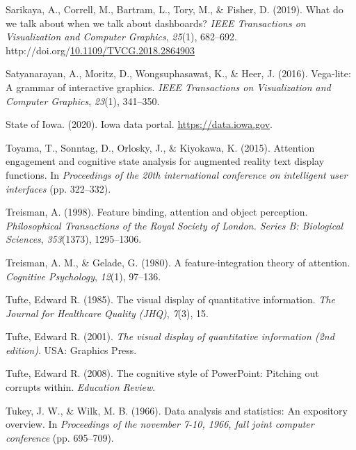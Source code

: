\documentclass[print]{nuthesis}
\newlength{\cslhangindent}
\newenvironment{CSLReferences}[2]%
{\setlength{\parindent}{0pt}%
\everypar{\setlength{\hangindent}{\cslhangindent}}\ignorespaces}%
{\par}
\begin{document}
\begin{CSLReferences}{1}{0}
\leavevmode{}%
Sarikaya, A., Correll, M., Bartram, L., Tory, M., \& Fisher, D. (2019). What do we talk about when we talk about dashboards? \emph{IEEE Transactions on Visualization and Computer Graphics}, \emph{25}(1), 682--692. http://doi.org/\href{https://doi.org/10.1109/TVCG.2018.2864903}{10.1109/TVCG.2018.2864903}

\leavevmode{}%
Satyanarayan, A., Moritz, D., Wongsuphasawat, K., \& Heer, J. (2016). Vega-lite: A grammar of interactive graphics. \emph{IEEE Transactions on Visualization and Computer Graphics}, \emph{23}(1), 341--350.

\leavevmode{}%
State of Iowa. (2020). Iowa data portal. \url{https://data.iowa.gov}.

\leavevmode{}%
Toyama, T., Sonntag, D., Orlosky, J., \& Kiyokawa, K. (2015). Attention engagement and cognitive state analysis for augmented reality text display functions. In \emph{Proceedings of the 20th international conference on intelligent user interfaces} (pp. 322--332).

\leavevmode{}%
Treisman, A. (1998). Feature binding, attention and object perception. \emph{Philosophical Transactions of the Royal Society of London. Series B: Biological Sciences}, \emph{353}(1373), 1295--1306.

\leavevmode{}%
Treisman, A. M., \& Gelade, G. (1980). A feature-integration theory of attention. \emph{Cognitive Psychology}, \emph{12}(1), 97--136.

\leavevmode{}%
Tufte, Edward R. (1985). The visual display of quantitative information. \emph{The Journal for Healthcare Quality (JHQ)}, \emph{7}(3), 15.

\leavevmode{}%
Tufte, Edward R. (2001). \emph{The visual display of quantitative information (2nd edition)}. USA: Graphics Press.

\leavevmode{}%
Tufte, Edward R. (2008). The cognitive style of PowerPoint: Pitching out corrupts within. \emph{Education Review}.

\leavevmode{}%
Tukey, J. W., \& Wilk, M. B. (1966). Data analysis and statistics: An expository overview. In \emph{Proceedings of the november 7-10, 1966, fall joint computer conference} (pp. 695--709).


\end{CSLReferences}
\end{document}
